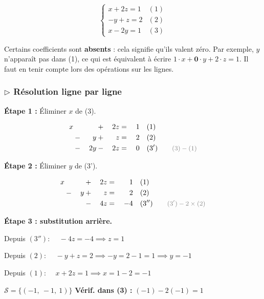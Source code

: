 \documentclass[12pt,a4paper]{article}
\newcommand{\ann}[1]{\qquad\textcolor{opcolor}{\text{\small #1}}}
\begin{document}
\[
\begin{cases}
  x + 2z = 1 & (1)\\
  {-y} + z = 2 & (2)\\
  x - 2y = 1 & (3)
\end{cases}
\]

\begin{noteimportante}
Certains coefficients sont \textbf{absents} : cela signifie qu'ils valent zéro. Par exemple, $y$ n'apparaît pas dans (1), ce qui est équivalent à écrire $1\cdot x + \mathbf{0}\cdot y + 2\cdot z = 1$. Il faut en tenir compte lors des opérations sur les lignes.
\end{noteimportante}

\subsubsection*{$\triangleright$ Résolution ligne par ligne}

\textbf{Étape 1 :} Éliminer $x$ de (3).

\begin{alignat*}{4}
  x &      &    &{}+{}& 2z  &{}={}& 1   &\quad (1)\\
    &{}-{}& y  &{}+{}& z   &{}={}& 2   &\quad (2)\\
    &{}-{}& 2y &{}-{}& 2z  &{}={}& 0   &\quad (3') \ann{$(3)-(1)$}
\end{alignat*}

\textbf{Étape 2 :} Éliminer $y$ de (3').

\begin{alignat*}{4}
  x &      &    &{}+{}& 2z  &{}={}& 1   &\quad (1)\\
    &{}-{}& y  &{}+{}& z   &{}={}& 2   &\quad (2)\\
    &      &    &{}-{}& 4z  &{}={}& -4  &\quad (3'') \ann{$(3') - 2\times(2)$}
\end{alignat*}

\textbf{Étape 3 : substitution arrière.}

Depuis $(3'')$: $\quad -4z = -4 \implies \boxed{z=1}$

Depuis $(2)$: $\quad -y + z = 2 \implies -y = 2-1 = 1 \implies \boxed{y=-1}$

Depuis $(1)$: $\quad x + 2z = 1 \implies x = 1-2 = \boxed{-1}$

\begin{solbox}
$\mathcal{S} = \{(-1,\ -1,\ 1)\}$ \hfill \textbf{Vérif. dans (3) :} $(-1) - 2(-1) = 1$ \checkmark
\end{solbox}
\end{document}
